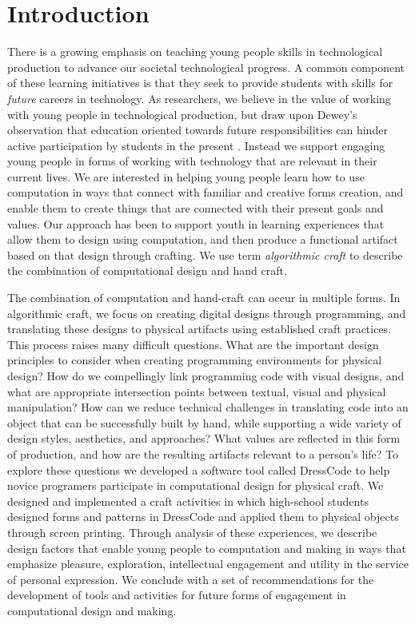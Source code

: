\documentclass{sigchi}
\begin{document}
\section{Introduction}
There is a growing emphasis on teaching young people skills in technological production to advance our societal technological progress. A common component of these learning initiatives is that they seek to provide students with skills for \textit{future} careers in technology. %
As researchers, we believe in the value of working with young people in technological production, but draw upon Dewey's observation that education oriented towards future responsibilities can hinder active participation by students in the present \cite{dewey}. Instead we support engaging young people in forms of working with technology that are relevant in their current lives. We are interested in helping young people learn how to use computation in ways that connect with familiar and creative forms creation, and enable them to create things that are connected with their present goals and values. Our approach has been to support youth in learning experiences that allow them to design using computation, and then produce a functional artifact based on that design through crafting. We use term \textit{algorithmic craft} to describe the combination of computational design and hand craft.

The combination of computation and hand-craft can occur in multiple forms. In algorithmic craft, we focus on creating digital designs through programming, and translating these designs to physical artifacts using established craft practices. This process raises many difficult questions. What are the important design principles to consider when creating programming environments for physical design? How do we compellingly link programming code with visual designs, and what are appropriate intersection points between textual, visual and physical manipulation? How can we reduce technical challenges in translating code into an object that can be successfully built by hand, while supporting a wide variety of design styles, aesthetics, and approaches? What values are reflected in this form of production, and how are the resulting artifacts relevant to a person's life? To explore these questions we developed a software tool called DressCode to help novice programers participate in computational design for physical craft. We designed and implemented a craft activities in which high-school students designed forms and patterns in DressCode and applied them to physical objects through screen printing. Through analysis of these experiences, we describe design factors that enable young people to computation and making in ways that emphasize pleasure, exploration, intellectual engagement and utility in the service of personal expression. We conclude with a set of recommendations for the development of tools and activities for future forms of engagement in computational design and making.
\end{document}
